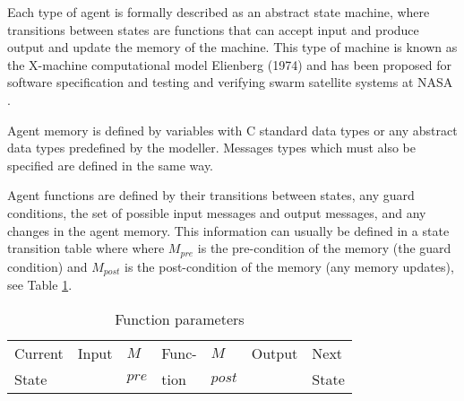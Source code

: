 \documentclass{aamas2009}
\begin{document}


Each type of agent
is formally described as an abstract state machine, where transitions
between states are functions that can accept input and produce output and
update the memory of the machine. This type of machine is known as the
X-machine computational model Elienberg (1974) and has been proposed for
software specification and testing \cite{HOLCOMBE:1986} and verifying swarm
satellite systems at NASA \cite{162}.


Agent memory is defined by variables with C standard data types or any abstract
data types predefined by the modeller. Messages types which must also be
specified are defined in the same way.

Agent functions are defined by their transitions between states, any guard
conditions, the set of possible input messages and output messages, and any
changes in the agent memory. This information can usually be defined in a state
transition table where where $M_{pre}$ is the pre-condition of the memory (the
guard condition) and $M_{post}$ is the post-condition of the memory (any memory
updates), see Table \ref{tab:funcparameters}.

\begin{table}[hbp]
\centering
\begin{tabular}{|l|l|l||l||l|l|l|}
\hline
Current&Input&$M$&Func-&$M$&Output&Next\\
State&&$pre$&tion&$post$&&State\\
\hline
\end{tabular}
\caption{Function parameters} \label{tab:funcparameters}
\end{table}
\end{document}
